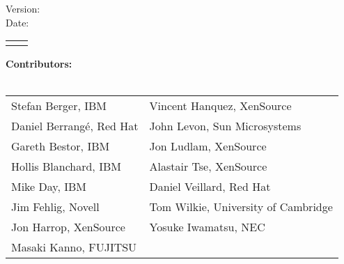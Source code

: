 %
%
%
%

\pagestyle{empty}

\doctitle{} \hfill \revstring{}

\vspace{1cm}

\begin{center}

\vspace{2cm}

\begin{Huge}
  \doctitle{}
\end{Huge}

\vspace{1cm}
\begin{Large}
Version: \revstring{}\\
Date: \datestring{}
\\
\releasestatement{}

\vspace{1cm}
\begin{tabular}{rl}
\docauthors{}
\end{tabular}
\end{Large}
\end{center}
\vspace{.5cm}
\begin{large}
\textbf{Contributors:} \\
\\
\begin{tabular}{p{}l}
Stefan Berger, IBM & Vincent Hanquez, XenSource \\
Daniel Berrang\'e, Red Hat & John Levon, Sun Microsystems \\
Gareth Bestor, IBM & Jon Ludlam, XenSource \\
Hollis Blanchard, IBM & Alastair Tse, XenSource \\
Mike Day, IBM & Daniel Veillard, Red Hat \\
Jim Fehlig, Novell & Tom Wilkie, University of Cambridge \\
Jon Harrop, XenSource & Yosuke Iwamatsu, NEC \\
Masaki Kanno, FUJITSU \\
\end{tabular}
\end{large}

\vfill

\noindent
\legalnotice{}

\newpage
\pagestyle{fancy}
